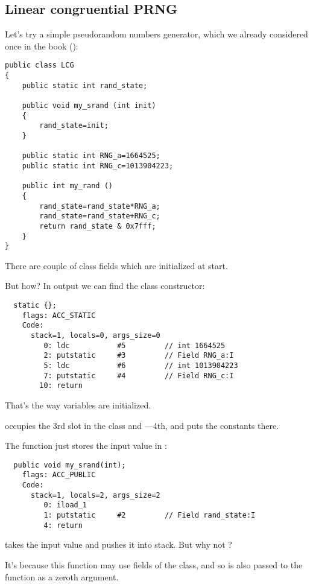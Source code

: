 \subsection{Linear congruential \ac{PRNG}}

Let's try a simple pseudorandom numbers generator, 
which we already considered once in the book ():


\begin{lstlisting}[style=customjava]
public class LCG 
{
	public static int rand_state;

	public void my_srand (int init)
	{
		rand_state=init;
	}

	public static int RNG_a=1664525;
	public static int RNG_c=1013904223;

	public int my_rand ()
	{
		rand_state=rand_state*RNG_a;
		rand_state=rand_state+RNG_c;
		return rand_state & 0x7fff;
	}
}
\end{lstlisting}

There are couple of class fields which are initialized at start.

But how?
In  output we can find the class constructor:


\begin{lstlisting}
  static {};
    flags: ACC_STATIC
    Code:
      stack=1, locals=0, args_size=0
         0: ldc           #5         // int 1664525
         2: putstatic     #3         // Field RNG_a:I
         5: ldc           #6         // int 1013904223
         7: putstatic     #4         // Field RNG_c:I
        10: return        
\end{lstlisting}

That's the way variables are initialized.

 occupies the 3rd slot in the class and ---4th, 
and  puts the constants there.


The  function just stores the input value in :


\begin{lstlisting}
  public void my_srand(int);
    flags: ACC_PUBLIC
    Code:
      stack=1, locals=2, args_size=2
         0: iload_1       
         1: putstatic     #2         // Field rand_state:I
         4: return        
\end{lstlisting}

 takes the input value and pushes it into stack. But why not ?

It's because this function may use fields of the class, and so  is also passed to
the function as a zeroth argument.

